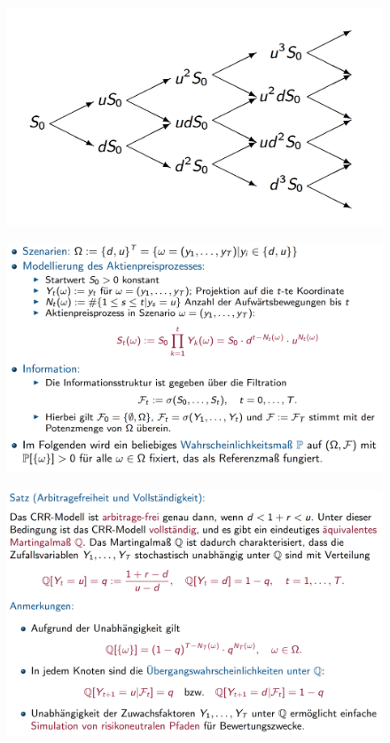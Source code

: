 \documentclass[12pt]{report}
\theoremstyle{dotless}
\theoremstyle{definition}
\begin{document}
\begin{figure}[H]
\centering
\includegraphics[width=\textwidth]{Bilder/BinomialmodellUpDown.png}
\end{figure}

\begin{figure}[H]
\centering
\includegraphics[width=\textwidth]{Bilder/FormaleKonstruktion.png}
\end{figure}

\begin{figure}[H]
\centering
\includegraphics[width=\textwidth]{Bilder/SatzArbitragefreiheit.png}
\end{figure}
\end{document}
